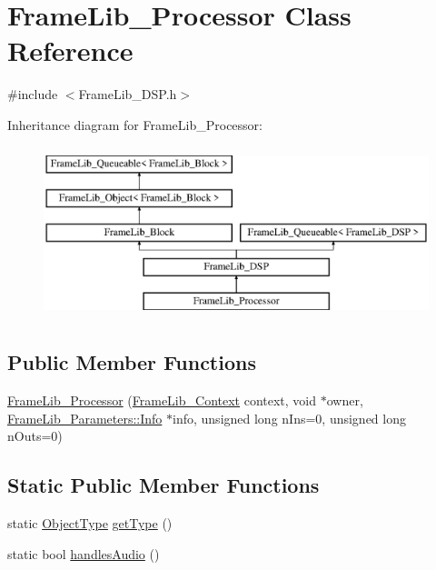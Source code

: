 \hypertarget{class_frame_lib___processor}{}\section{Frame\+Lib\+\_\+\+Processor Class Reference}
\label{class_frame_lib___processor}


{\ttfamily \#include $<$Frame\+Lib\+\_\+\+D\+S\+P.\+h$>$}

Inheritance diagram for Frame\+Lib\+\_\+\+Processor\+:\begin{figure}[H]
\begin{center}
\leavevmode
\includegraphics[height=5.000000cm]{class_frame_lib___processor}
\end{center}
\end{figure}
\subsection*{Public Member Functions}
\begin{DoxyCompactItemize}
\item 
\hyperlink{class_frame_lib___processor_acd8ddc4d9b3d10ef8cd6b63716979711}{Frame\+Lib\+\_\+\+Processor} (\hyperlink{class_frame_lib___context}{Frame\+Lib\+\_\+\+Context} context, void $\ast$owner, \hyperlink{class_frame_lib___parameters_1_1_info}{Frame\+Lib\+\_\+\+Parameters\+::\+Info} $\ast$info, unsigned long n\+Ins=0, unsigned long n\+Outs=0)
\end{DoxyCompactItemize}
\subsection*{Static Public Member Functions}
\begin{DoxyCompactItemize}
\item 
static \hyperlink{_frame_lib___types_8h_a842c5e2e69277690b064bf363c017980}{Object\+Type} \hyperlink{class_frame_lib___processor_a9cf7b310f4d1ca8843b201d692fcf544}{get\+Type} ()
\item 
static bool \hyperlink{class_frame_lib___processor_a77869c3007f363ce914d9e0073953660}{handles\+Audio} ()
\end{DoxyCompactItemize}
